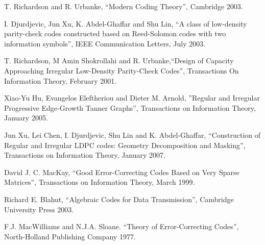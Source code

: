 \begin{thebibliography}{9}

 T. Richardson and R. Urbanke, ``Modern Coding Theory'', Cambridge 2003.

 I. Djurdjevic,  Jun Xu, K. Abdel-Ghaffar and Shu Lin, 
``A class of low-density parity-check codes constructed based on Reed-Solomon codes with two information symbols'',
IEEE Communication Letters, July 2003.

 T. Richardson, M Amin Shokrollahi and R. Urbanke,``Design of Capacity Approaching Irregular 
Low-Density Parity-Check Codes'', Transactions On Information Theory, February 2001.

 Xiao-Yu Hu, Evangelos Eleftheriou and Dieter M. Arnold, ''Regular and Irregular Progressive Edge-Growth
Tanner Graphs'', Transactions on Information Theory, January 2005.

 Jun Xu, Lei Chen, I. Djurdjevic, Shu Lin and K. Abdel-Ghaffar, ``Construction of Regular and Irregular
LDPC codes: Geometry Decomposition and Masking'', Transactions on Information Theory, January 2007.

 David J. C. MacKay, ``Good Error-Correcting Codes Based on Very Sparse Matrices'', Transactions on Information
Theory, March 1999.

 Richard E. Blahut, ``Algebraic Codes for Data Transmission'', Cambridge University Press 2003.

 F.J. MacWilliams and N.J.A. Sloane. ``Theory of Error-Correcting Codes'', North-Holland Publishing Company 1977. 
\end{thebibliography}